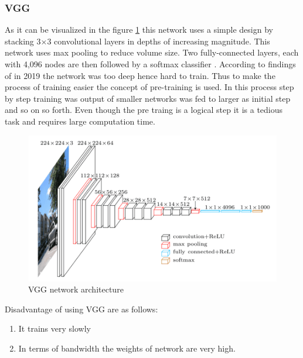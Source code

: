    
    \subsubsection{VGG}
    As it can be visualized in the figure \ref{l05} this network uses a simple design by stacking 3×3 convolutional layers in depths of increasing magnitude. This network uses max pooling to reduce volume size. Two fully-connected layers, each with 4,096 nodes are then followed by a softmax classifier \cite{simonyan2014very}. 
    According to findings of \cite{simonyan2014very} in 2019 the network was too deep hence hard to train. Thus to make the process of training easier the concept of pre-training is used. In this process step by step training was output of smaller networks was fed to larger as initial step and so on so forth. 
    Even though the pre traing is a logical step it is a tedious task and requires large computation time.
    
     \begin{figure}[h]
     	\centering
     	\includegraphics[width=0.8\linewidth]{images/imagenet_vgg16.png}
     	\caption{VGG network architecture \cite{simonyan2014very}}
     	\label{l05}	
     \end{figure}
    
    Disadvantage of using VGG are as follows:
    \begin{enumerate}
    	\item It trains very slowly
    	\item In terms of bandwidth the weights of network are very high.
    \end{enumerate}
    
